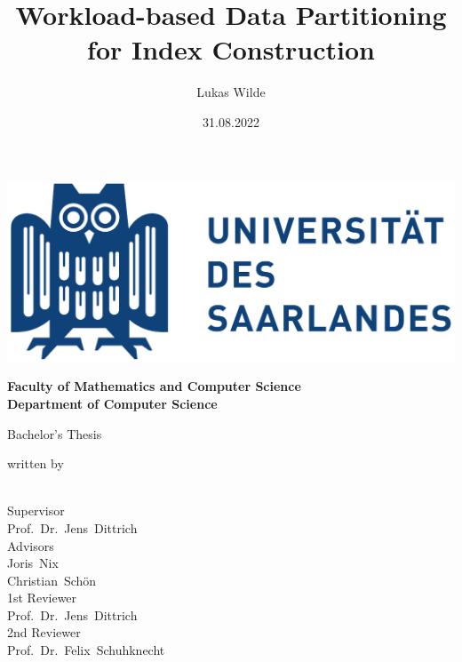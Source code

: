 \documentclass[11pt,a4paper,twoside,titlepage,british]{report}
\author{Lukas Wilde}
\date{31.08.2022}
\title{Workload-based Data Partitioning for Index Construction}
\makeatletter
\theoremstyle{definition}
\let\runauthor\@author
\let\runtitle\@title
\let\rundate\@date
\makeatother
\begin{document}
\begin{titlepage}
    \begin{center}
        \includegraphics[scale=.5]{figures/logo.pdf}

        \bfseries
        \vspace{2em}
        Faculty of Mathematics and Computer Science \\
        Department of Computer Science

        \vspace{2cm}
        \begin{doublespace}
            {\LARGE \runtitle}
        \end{doublespace}

        \vspace{1cm} 
        {\large Bachelor's Thesis}

        \vfill
        {\normalfont written by}
        \\[1em]
        {\Large \runauthor}
        \\[1em]
        \textbf{\printdate{\rundate}}

        \vfill
        {\normalfont Supervisor}
        \\
        {\large Prof.~Dr.~Jens~Dittrich}
        \\[.5em]
        {\normalfont Advisors}
        \\
        {\large Joris~Nix}
        \\
        {\large Christian~Schön}
        \\[.5em]
        {\normalfont 1st Reviewer}
        \\
        {\large Prof.~Dr.~Jens~Dittrich}
        \\[.5em]
        {\normalfont 2nd Reviewer}
        \\
        {\large Prof.~Dr.~Felix~Schuhknecht}
    \end{center}
\end{titlepage}
\setcounter{page}{2}
\end{document}
